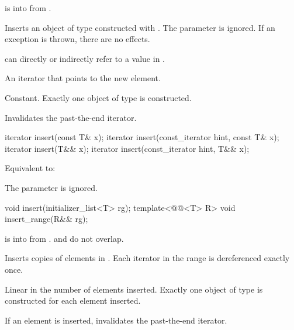 \begin{itemdescr}
\pnum
\expects
{} is  into  from .

\pnum
\effects
Inserts an object of type 
constructed with .
The  parameter is ignored.
If an exception is thrown, there are no effects.
\begin{note}
 can directly or indirectly refer to a value in .
\end{note}

\pnum
\returns
An iterator that points to the new element.

\pnum
\complexity
Constant. Exactly one object of type  is constructed.

\pnum
\remarks
Invalidates the past-the-end iterator.
\end{itemdescr}

%
\begin{itemdecl}
iterator insert(const T& x);
iterator insert(const_iterator hint, const T& x);
iterator insert(T&& x);
iterator insert(const_iterator hint, T&& x);
\end{itemdecl}

\begin{itemdescr}
\pnum
\effects
Equivalent to: 
\begin{note}
The  parameter is ignored.
\end{note}
\end{itemdescr}

%
\begin{itemdecl}
void insert(initializer_list<T> rg);
template<@@<T> R>
  void insert_range(R&& rg);
\end{itemdecl}

\begin{itemdescr}
\pnum
\expects
{} is  into 
from .
 and  do not overlap.

\pnum
\effects
Inserts copies of elements in .
Each iterator in the range  is dereferenced exactly once.

\pnum
\complexity
Linear in the number of elements inserted.
Exactly one object of type  is constructed for each element inserted.

\pnum
\remarks
If an element is inserted, invalidates the past-the-end iterator.
\end{itemdescr}

